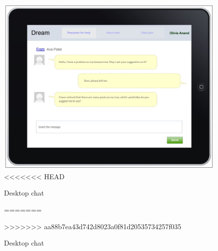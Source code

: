 \begin{figure}[H]
	\centering
    \includegraphics[page=1, width=\textwidth]{Images/desktop_chat.JPG}
<<<<<<< HEAD
	\caption{\label{fig:FE_image4}Desktop chat}
=======
	\caption{\label{fig:FE_image}Desktop chat}
>>>>>>> aa88b7ea43d742d8023a0f81d20535734257f035
\end{figure}